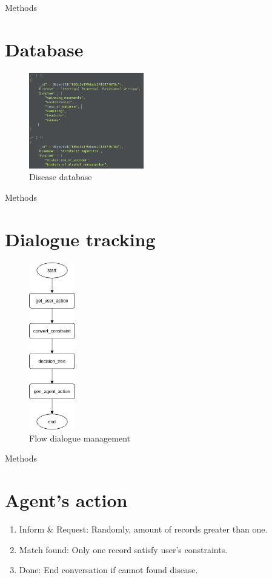 \documentclass[10pt]{beamer}
\begin{document}
\begin{frame}{Methods}
    \section{Database}
    \begin{figure}[H]
    \centering
    \includegraphics[width=5cm]{image/dbms.png}
    \caption{Disease database}
    \label{fig:di_dbms}
    \end{figure}
\end{frame}

\begin{frame}{Methods}
    \section{Dialogue tracking}
    \begin{figure}[H]
    \centering
    \includegraphics[width=2cm, angle=90]{image/flow_dm.png}
    \caption{Flow dialogue management}
    \label{fig:flow_dm}
    \end{figure}
\end{frame}

\begin{frame}{Methods}
    \section{Agent's action}
    \begin{enumerate}
        \item Inform \& Request: Randomly, amount of records greater than one.
        \item Match found: Only one record satisfy user's constraints.
        \item Done: End conversation if cannot found disease.
        
    \end{enumerate}
\end{frame}
\end{document}
